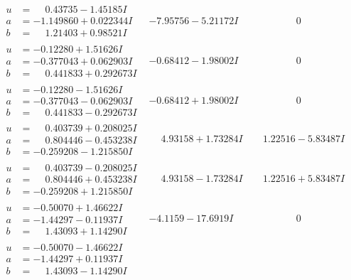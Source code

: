 \documentclass[1p]{elsarticle_modified}
\theoremstyle{definition}
\begin{document}
$$\begin{array}{c|c|c}
\begin{aligned}
u &= \phantom{-}0.43735 - 1.45185 I \\
a &= -1.149860 + 0.022344 I \\
b &= \phantom{-}1.21403 + 0.98521 I\end{aligned}
 & -7.95756 - 5.21172 I & \phantom{-0.000000 } 0 \\ \hline\begin{aligned}
u &= -0.12280 + 1.51626 I \\
a &= -0.377043 + 0.062903 I \\
b &= \phantom{-}0.441833 + 0.292673 I\end{aligned}
 & -0.68412 - 1.98002 I & \phantom{-0.000000 } 0 \\ \hline\begin{aligned}
u &= -0.12280 - 1.51626 I \\
a &= -0.377043 - 0.062903 I \\
b &= \phantom{-}0.441833 - 0.292673 I\end{aligned}
 & -0.68412 + 1.98002 I & \phantom{-0.000000 } 0 \\ \hline\begin{aligned}
u &= \phantom{-}0.403739 + 0.208025 I \\
a &= \phantom{-}0.804446 - 0.453238 I \\
b &= -0.259208 - 1.215850 I\end{aligned}
 & \phantom{-}4.93158 + 1.73284 I & \phantom{-}1.22516 - 5.83487 I \\ \hline\begin{aligned}
u &= \phantom{-}0.403739 - 0.208025 I \\
a &= \phantom{-}0.804446 + 0.453238 I \\
b &= -0.259208 + 1.215850 I\end{aligned}
 & \phantom{-}4.93158 - 1.73284 I & \phantom{-}1.22516 + 5.83487 I \\ \hline\begin{aligned}
u &= -0.50070 + 1.46622 I \\
a &= -1.44297 - 0.11937 I \\
b &= \phantom{-}1.43093 + 1.14290 I\end{aligned}
 & -4.1159 - 17.6919 I & \phantom{-0.000000 } 0 \\ \hline\begin{aligned}
u &= -0.50070 - 1.46622 I \\
a &= -1.44297 + 0.11937 I \\
b &= \phantom{-}1.43093 - 1.14290 I\end{aligned}

\end{array}$$
\end{document}
